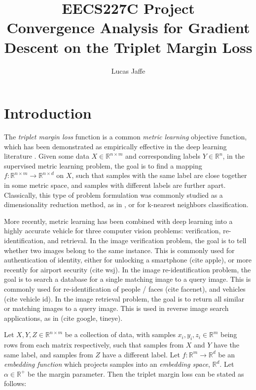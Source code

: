 \documentclass[11pt]{article}
\begin{document}
\author{Lucas Jaffe}

\title{
    EECS227C Project \\
    \large Convergence Analysis for Gradient Descent on the Triplet Margin Loss
    }
\maketitle

\medskip

\section{Introduction}

The \textit{triplet margin loss} function is a common \textit{metric learning} objective function, which has been demonstrated as empirically effective in the deep learning literature \cite{schroff_facenet_2015, hermans_defense_2017}. Given some data $X \in \mathbb{R}^{n \times m}$ and corresponding labels $Y \in \mathbb{R}^n$, in the supervised metric learning problem, the goal is to find a mapping $f: \mathbb{R}^{n \times m} \rightarrow \mathbb{R}^{n \times d}$ on $X$, such that samples with the same label are close together in some metric space, and samples with different labels are further apart. Classically, this type of problem formulation was commonly studied as a dimensionality reduction method, as in \cite{hadsell_dimensionality_2006}, or for k-nearest neighbors classification. 

More recently, metric learning has been combined with deep learning into a highly accurate vehicle for three computer vision problems: verification, re-identification, and retrieval. In the image verification problem, the goal is to tell whether two images belong to the same instance. This is commonly used for authentication of identity, either for unlocking a smartphone (cite apple), or more recently for airport security (cite wsj). In the image re-identification problem, the goal is to search a database for a single matching image to a query image. This is commonly used for re-identification of people / faces (cite facenet), and vehicles (cite vehicle id). In the image retrieval problem, the goal is to return all similar or matching images to a query image. This is used in reverse image search applications, as in (cite google, tineye).

Let $X, Y, Z \in \mathbb{R}^{n \times m}$ be a collection of data, with samples $x_i, y_i, z_i \in \mathbb{R}^m$ being rows from each matrix respectively, such that samples from $X$ and $Y$ have the same label, and samples from $Z$ have a different label. Let $f: \mathbb{R}^m \rightarrow \mathbb{R}^d$ be an \textit{embedding function} which projects samples into an \textit{embedding space}, $\mathbb{R}^d$. Let $\alpha \in \mathbb{R}^+$ be the margin parameter. Then the triplet margin loss can be stated as follows:
\end{document}
